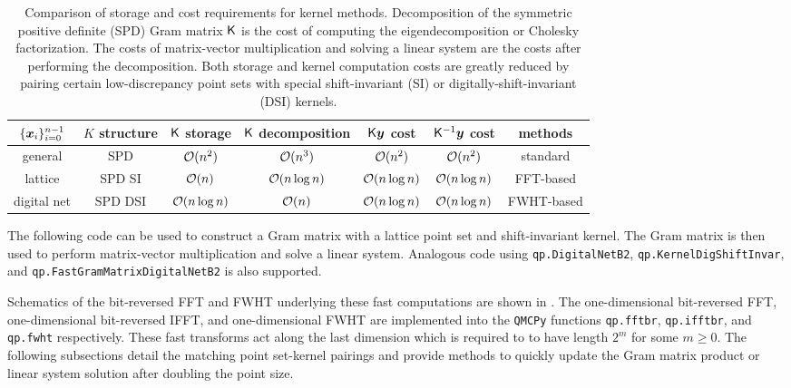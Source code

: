 \documentclass[acmsmall]{acmart}
\begin{document}
\begin{table}[H]
    \centering
    \begin{tabular}{ccccccc} 
        $\{{\boldsymbol{x}}_i\}_{i=0}^{n-1}$ & $K$ structure & ${\mathsf{K}}$ storage & ${\mathsf{K}}$ decomposition & ${\mathsf{K}} {\boldsymbol{y}}$ cost & ${\mathsf{K}}^{-1} {\boldsymbol{y}}$ cost & methods \\ 
        \hline 
        general & SPD & ${\mathcal{O}}(n^2)$ & ${\mathcal{O}}(n^3)$ & ${\mathcal{O}}(n^2)$ & ${\mathcal{O}}(n^2)$ & standard  \\
        lattice & SPD SI & ${\mathcal{O}}(n)$ & ${\mathcal{O}}(n \log n)$ & ${\mathcal{O}}(n \log n)$ & ${\mathcal{O}}(n \log n)$ & FFT-based \\ 
        digital net & SPD DSI & ${\mathcal{O}}(n \log n)$ & ${\mathcal{O}}(n)$ & ${\mathcal{O}}(n \log n)$ & ${\mathcal{O}}(n \log n)$ &FWHT-based
    \end{tabular}
    \caption{Comparison of storage and cost requirements for kernel methods. Decomposition of the symmetric positive definite (SPD) Gram matrix ${\mathsf{K}}$ is the cost of computing the eigendecomposition or Cholesky factorization. The costs of matrix-vector multiplication and solving a linear system are the costs after performing the decomposition. Both storage and kernel computation costs are greatly reduced by pairing certain low-discrepancy point sets with special shift-invariant (SI) or digitally-shift-invariant (DSI) kernels.}
    \label{tab:com_kernel_costs}
\end{table}

The following code can be used to construct a Gram matrix with a lattice point set and shift-invariant kernel. The Gram matrix is then used to perform matrix-vector multiplication and solve a linear system. Analogous code using \texttt{qp.DigitalNetB2}, \texttt{qp.KernelDigShiftInvar}, and \texttt{qp.FastGramMatrixDigitalNetB2} is also supported. 


Schematics of the bit-reversed FFT and FWHT underlying these fast computations are shown in . The one-dimensional bit-reversed FFT, one-dimensional bit-reversed IFFT, and one-dimensional FWHT are implemented into the \texttt{QMCPy} functions \texttt{qp.fftbr}, \texttt{qp.ifftbr}, and \texttt{qp.fwht} respectively. These fast transforms act along the last dimension which is required to to have length $2^m$ for some $m \geq 0$.  The following subsections detail the matching point set-kernel pairings and provide methods to quickly update the Gram matrix product or linear system solution after doubling the point size.
\end{document}
